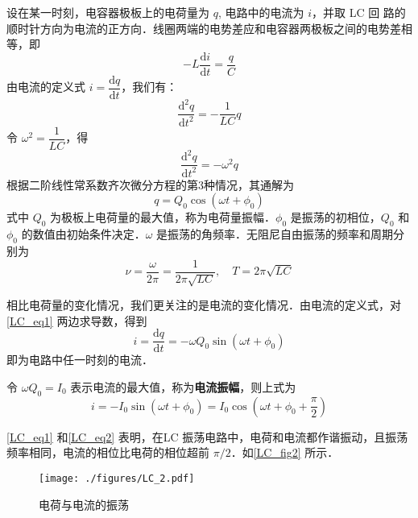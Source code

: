 设在某一时刻，电容器极板上的电荷量为 $q$, 电路中的电流为 $i$，并取 LC 回
路的顺时针方向为电流的正方向．线圈两端的电势差应和电容器两极板之间的电势差相等，即
\begin{equation}
-L \frac{\mathrm{d} i}{\mathrm{d} t}=\frac{q}{C}
\end{equation}
由电流的定义式 $i=\dfrac{\mathrm{d} q}{\mathrm{d} t}$，我们有：
\begin{equation}
\frac{\mathrm{d}^{2} q}{\mathrm{d} t^{2}}=-\frac{1}{L C} q
\end{equation}
令 $\omega^{2}=\dfrac{1}{L C}$，得
\begin{equation}
\frac{\mathrm{d}^{2} q}{\mathrm{d} t^{2}}=-\omega^{2} q
\end{equation}
根据二阶线性常系数齐次微分方程的第3种情况，其通解为
\begin{equation} \label{LC_eq1}
q=Q_{0} \cos \left(\omega t+\phi_{0}\right)
\end{equation}
式中 $Q_0$ 为极板上电荷量的最大值，称为电荷量振幅．$\phi_0$ 是振荡的初相位，$Q_0$ 和 $\phi_0$ 的数值由初始条件决定．$\omega$ 是振荡的角频率．无阻尼自由振荡的频率和周期分别为
\begin{equation}
\nu=\frac{\omega}{2 \pi}=\frac{1}{2 \pi \sqrt{L C}}, \quad T=2 \pi \sqrt{L C}
\end{equation}

相比电荷量的变化情况，我们更关注的是电流的变化情况．由电流的定义式，对\autoref{LC_eq1} 两边求导数，得到
\begin{equation}
i=\frac{\mathrm{d} q}{\mathrm{d} t}=-\omega Q_{0} \sin \left(\omega t+\phi_{0}\right)
\end{equation}
即为电路中任一时刻的电流．

令 $\omega Q_0=I_0$ 表示电流的最大值，称为\textbf{电流振幅}，则上式为
\begin{equation} \label{LC_eq2}
i=-I_{0} \sin \left(\omega t+\phi_{0}\right)=I_{0} \cos \left(\omega t+\phi_{0}+\frac{\pi}{2}\right)
\end{equation}

\autoref{LC_eq1} 和\autoref{LC_eq2} 表明，在LC 振荡电路中，电荷和电流都作谐振动，且振荡频率相同，电流的相位比电荷的相位超前 $\pi/2$．如\autoref{LC_fig2} 所示．

\begin{figure}[ht]
\centering
\texttt{[image: ./figures/LC\_2.pdf]}
\caption{电荷与电流的振荡} \label{LC_fig2}
\end{figure}

